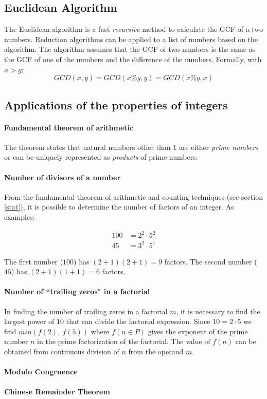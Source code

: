 \subsection{Euclidean Algorithm}
The Euclidean algorithm is a fast \emph{recursive} method to calculate the GCF of a two numbers.
Reduction algorithms can be applied to a list of numbers based on the algorithm.
The algorithm assumes that the GCF of two numbers is the same as the GCF of one of the numbers and the difference of the numbers.
Formally, with $x > y$:
\[
GCD(x, y) = GCD(x\%y, y) = GCD(x\%y, x)
\]

\subsection{Applications of the properties of integers}
\paragraph{Fundamental theorem of arithmetic}
The theorem states that natural numbers other than $1$ are either \emph{prime numbers} or can be uniquely represented as \emph{products} of prime numbers.

\paragraph{Number of divisors of a number}
From the fundamental theorem of arithmetic and counting techniques (see section \ref{stat}), it is possible to determine the number of factors of an integer.
As examples:

\begin{align*}
100 &= 2^2 \cdot 5^2 \\
45 &= 3^2 \cdot 5^1
\end{align*}

The first number ($100$) has $(2+1)(2+1) = 9$ factors.
The second number ($45$) has $(2+1)(1+1) = 6$ factors.

\paragraph{Number of ``trailing zeros" in a factorial}
In finding the number of trailing zeros in a factorial $m$, it is necessary to find the largest power of $10$ that can divide the factorial expression.
Since $10 = 2\cdot 5$ we find $min(f(2),\ f(5))$ where $f(n\in P)$ gives the exponent of the prime number $n$ in the prime factorization of the factorial.
The value of $f(n)$ can be obtained from continuous division of $n$ from the operand $m$.

\paragraph{Modulo Congruence}

\paragraph{Chinese Remainder Theorem}
